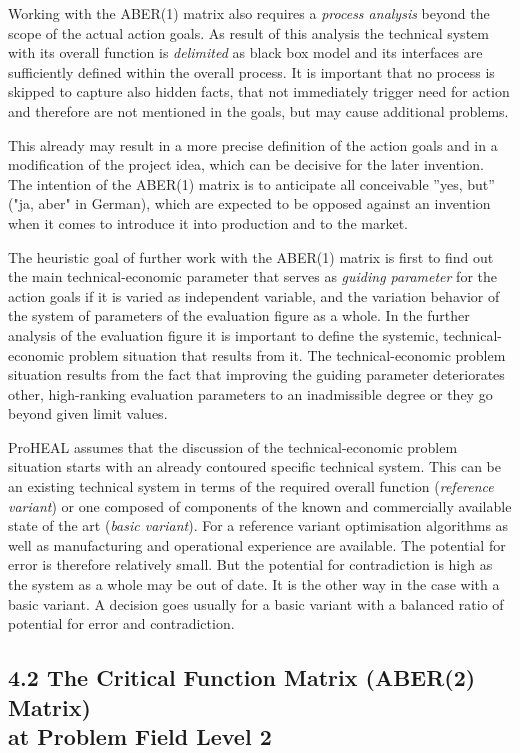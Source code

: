 \documentclass[12pt,a4paper]{article}
\begin{document}
Working with the ABER(1) matrix also requires a \emph{process analysis} beyond
the scope of the actual action goals. As result of this analysis the technical
system with its overall function is \emph{delimited} as black box model and
its interfaces are sufficiently defined within the overall process. It is
important that no process is skipped to capture also hidden facts, that not
immediately trigger need for action and therefore are not mentioned in the
goals, but may cause additional problems.

This already may result in a more precise definition of the action goals and
in a modification of the project idea, which can be decisive for the later
invention. The intention of the ABER(1) matrix is to anticipate all
conceivable ”yes, but” ("ja, aber" in German), which are expected to be
opposed against an invention when it comes to introduce it into production and
to the market.

The heuristic goal of further work with the ABER(1) matrix is first to find
out the main technical-economic parameter that serves as \emph{guiding
  parameter} for the action goals if it is varied as independent variable, and
the variation behavior of the system of parameters of the evaluation figure as
a whole. In the further analysis of the evaluation figure it is important to
define the systemic, technical-economic problem situation that results from
it.  The technical-economic problem situation results from the fact that
improving the guiding parameter deteriorates other, high-ranking evaluation
parameters to an inadmissible degree or they go beyond given limit values.

ProHEAL assumes that the discussion of the technical-economic problem
situation starts with an already contoured specific technical system. This can
be an existing technical system in terms of the required overall function
(\emph{reference variant}) or one composed of components of the known and
commercially available state of the art (\emph{basic variant}). For a
reference variant optimisation algorithms as well as manufacturing and
operational experience are available. The potential for error is therefore
relatively small. But the potential for contradiction is high as the system as
a whole may be out of date. It is the other way in the case with a basic
variant. A decision goes usually for a basic variant with a balanced ratio of
potential for error and contradiction.

\subsection*{4.2 The Critical Function Matrix (ABER(2) Matrix)\\ at Problem
  Field Level 2}
\end{document}
